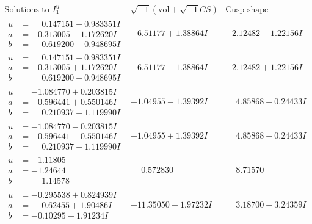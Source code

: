 \documentclass[1p]{elsarticle_modified}
\theoremstyle{definition}
\newcommand{\I}{\sqrt{-1}}
\begin{document}
$$\begin{array}{c|c|c}  
\text{Solutions to }I^u_{1}& \I (\text{vol} + \sqrt{-1}CS) & \text{Cusp shape}\\
 \hline 
\begin{aligned}
u &= \phantom{-}0.147151 + 0.983351 I \\
a &= -0.313005 - 1.172620 I \\
b &= \phantom{-}0.619200 - 0.948695 I\end{aligned}
 & -6.51177 + 1.38864 I & -2.12482 - 1.22156 I \\ \hline\begin{aligned}
u &= \phantom{-}0.147151 - 0.983351 I \\
a &= -0.313005 + 1.172620 I \\
b &= \phantom{-}0.619200 + 0.948695 I\end{aligned}
 & -6.51177 - 1.38864 I & -2.12482 + 1.22156 I \\ \hline\begin{aligned}
u &= -1.084770 + 0.203815 I \\
a &= -0.596441 + 0.550146 I \\
b &= \phantom{-}0.210937 + 1.119990 I\end{aligned}
 & -1.04955 - 1.39392 I & \phantom{-}4.85868 + 0.24433 I \\ \hline\begin{aligned}
u &= -1.084770 - 0.203815 I \\
a &= -0.596441 - 0.550146 I \\
b &= \phantom{-}0.210937 - 1.119990 I\end{aligned}
 & -1.04955 + 1.39392 I & \phantom{-}4.85868 - 0.24433 I \\ \hline\begin{aligned}
u &= -1.11805\phantom{ +0.000000I} \\
a &= -1.24644\phantom{ +0.000000I} \\
b &= \phantom{-}1.14578\phantom{ +0.000000I}\end{aligned}
 & \phantom{-}0.572830\phantom{ +0.000000I} & \phantom{-}8.71570\phantom{ +0.000000I} \\ \hline\begin{aligned}
u &= -0.295538 + 0.824939 I \\
a &= \phantom{-}0.62455 + 1.90486 I \\
b &= -0.10295 + 1.91234 I\end{aligned}
 & -11.35050 - 1.97232 I & \phantom{-}3.18700 + 3.24359 I \\ \hline\begin{aligned}

\end{aligned}
\end{array}$$
\end{document}

